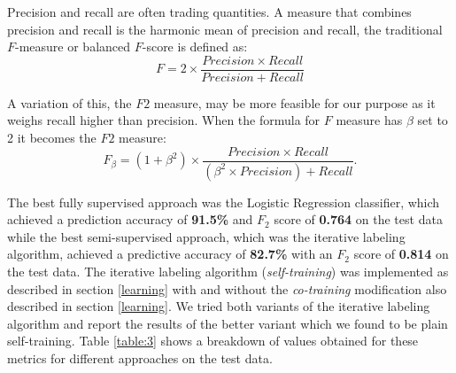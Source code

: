 \documentclass[10pt,letterpaper]{article}
\begin{document}
Precision and recall are often trading quantities.  A measure that combines precision and recall is the harmonic mean of precision and recall, the traditional $F$-measure or balanced $F$-score \cite{REF39} is defined as:
\begin{equation}
F=2 \times \frac {Precision\times Recall }{Precision+Recall}
\end{equation}

A variation of this, the $F2$ measure, may be more feasible for our purpose as it weighs recall higher than precision. When the formula for $F$ measure has $\beta$ set to 2 it becomes the $F2$ measure:
\begin{equation}
F_\beta=(1+\beta^2) \times \frac {Precision\times Recall }{(\beta^2 \times Precision)+Recall}.
\end{equation}

The best fully supervised approach was the Logistic Regression classifier, which achieved a prediction accuracy of \textbf{91.5\%} and $F_2$ score of \textbf{0.764} on the test data while the best semi-supervised approach, which was the iterative labeling algorithm, achieved a predictive accuracy of \textbf{82.7\%} with an $F_2$ score of \textbf{0.814} on the test data. The iterative labeling algorithm (\textit{self-training}) was implemented as described in section \ref{learning} with and without the \textit{co-training} modification also described in section \ref{learning}. We tried both variants of the iterative labeling algorithm and report the results of the better variant which we found to be plain self-training. Table \ref{table:3} shows a breakdown of values obtained for these metrics for different approaches on the test data. 
\end{document}
